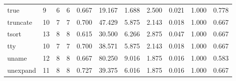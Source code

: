 \begin{longtable}{lp{1.2cm}p{1.2cm}p{1.2cm}p{1.2cm}p{1.2cm}p{1.2cm}p{1.2cm}p{1.2cm}p{1.2cm}p{1.2cm}}
true      &                            9 &                  6 &                                 6 &                                      0.667 &                                 19.167 &                                        1.688 &                             2.500 &                                   0.021 &                              1.000 &                                              0.778 \\
truncate  &                           10 &                  7 &                                 7 &                                      0.700 &                                 47.429 &                                        5.875 &                             2.143 &                                   0.018 &                              1.000 &                                              0.667 \\
tsort     &                           13 &                  8 &                                 8 &                                      0.615 &                                 30.500 &                                        6.266 &                             2.875 &                                   0.047 &                              1.000 &                                              0.667 \\
tty       &                           10 &                  7 &                                 7 &                                      0.700 &                                 38.571 &                                        5.875 &                             2.143 &                                   0.018 &                              1.000 &                                              0.667 \\
uname     &                           12 &                  8 &                                 8 &                                      0.667 &                                 80.250 &                                        9.016 &                             1.875 &                                   0.016 &                              1.000 &                                              0.583 \\
unexpand  &                           11 &                  8 &                                 8 &                                      0.727 &                                 39.375 &                                        6.016 &                             1.875 &                                   0.016 &                              1.000 &                                              0.667 \\

\end{longtable}
